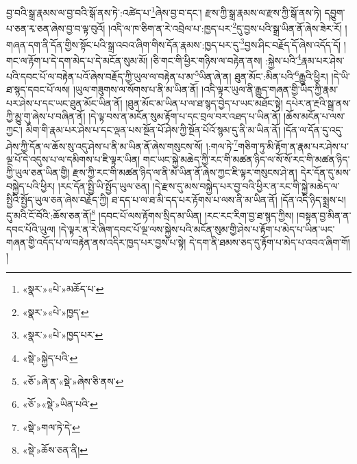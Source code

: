 བྱ་བའི་སྒྲ་རྣམས་ལ་བྱ་བའི་སྒོ་ནས་ཏེ་:འཚེད་པ་\footnote{«སྣར་»«པེ་»མཆོད་པ་}ཞེས་བྱ་བ་དང་། རྫས་ཀྱི་སྒྲ་རྣམས་ལ་རྫས་ཀྱི་སྒོ་ནས་ཏེ། དབྱུག་པ་ཅན་རྭ་ཅན་ཞེས་བྱ་བ་ལྟ་བུའོ། །འདི་ལ་ཁ་ཅིག་ན་རེ་འབྲེལ་པ་:ཁྱད་པར་\footnote{«སྣར་»«པེ་»ཁྱད་}དུ་བྱས་པའི་སྒྲ་ཡིན་ནོ་ཞེས་ཟེར་རོ། །གཞན་དག་ནི་དོན་གྱིས་སྟོང་པའི་སྒྲ་འབའ་ཞིག་གིས་དོན་རྣམས་:ཁྱད་པར་དུ་\footnote{«སྣར་»«པེ་»ཁྱད་པར་}བྱས་ཤིང་བརྗོད་དོ་ཞེས་འདོད་དོ། །གང་ལ་རྟོག་པ་དེ་དག་མེད་པ་དེ་མངོན་སུམ་མོ། །ཅི་གང་གི་ཕྱིར་གཉིས་ལ་བརྟེན་ནས། :སྐྱེས་པའི་\footnote{«སྡེ་»སྐྱེད་པའི་}རྣམ་པར་ཤེས་པའི་དབང་པོ་ལ་བརྟེན་པའོ་ཞེས་བརྗོད་ཀྱི་ཡུལ་ལ་བརྟེན་པ་མ་\footnote{«ཅོ་»ཞེ་ན་«སྡེ་»ཞེས་ཅི་ནས་}ཡིན་ཞེ་ན། ཐུན་མོང་:མིན་པའི་\footnote{«ཅོ་»«སྡེ་»ཡིན་པའི་}རྒྱུའི་ཕྱིར། །དེ་ཡི་ཐ་སྙད་དབང་པོ་ལས། །ཡུལ་གཟུགས་ལ་སོགས་པ་ནི་མ་ཡིན་ནོ། །འདི་ལྟར་ཡུལ་ནི་རྒྱུད་གཞན་གྱི་ཡིད་ཀྱི་རྣམ་པར་ཤེས་པ་དང་ཡང་ཐུན་མོང་ཡིན་ནོ། །ཐུན་མོང་མ་ཡིན་པ་ལ་ཐ་སྙད་བྱེད་པ་ཡང་མཐོང་སྟེ། དཔེར་ན་རྔའི་སྒྲ་ནས་ཀྱི་མྱུ་གུ་ཞེས་པ་བཞིན་ནོ། །དེ་ལྟ་བས་ན་མངོན་སུམ་རྟོག་པ་དང་བྲལ་བར་འཐད་པ་ཡིན་ནོ། །ཆོས་མངོན་པ་ལས་ཀྱང་། མིག་གི་རྣམ་པར་ཤེས་པ་དང་ལྡན་པས་སྔོན་པོ་ཤེས་ཀྱི་སྔོན་པོའོ་སྙམ་དུ་ནི་མ་ཡིན་ནོ། །དོན་ལ་དོན་དུ་འདུ་ཤེས་ཀྱི་དོན་ལ་ཆོས་སུ་འདུ་ཤེས་པ་ནི་མ་ཡིན་ནོ་ཞེས་གསུངས་སོ། །:གལ་ཏེ་\footnote{«སྡེ་»གལ་ཏེ་དེ་}གཅིག་ཏུ་མི་རྟོག་ན་རྣམ་པར་ཤེས་པ་ལྔ་པོ་དེ་འདུས་པ་ལ་དམིགས་པ་ཇི་ལྟར་ཡིན། གང་ཡང་སྐྱེ་མཆེད་ཀྱི་རང་གི་མཚན་ཉིད་ལ་སོ་སོ་རང་གི་མཚན་ཉིད་ཀྱི་ཡུལ་ཅན་ཡིན་གྱི། རྫས་ཀྱི་རང་གི་མཚན་ཉིད་ལ་ནི་མ་ཡིན་ནོ་ཞེས་ཀྱང་ཇི་ལྟར་གསུངས་ཤེ་ན། དེར་དོན་དུ་མས་བསྐྱེད་པའི་ཕྱིར། །རང་དོན་སྤྱི་ཡི་སྤྱོད་ཡུལ་ཅན། །དེ་རྫས་དུ་མས་བསྐྱེད་པར་བྱ་བའི་ཕྱིར་ན་རང་གི་སྐྱེ་མཆེད་ལ་སྤྱིའི་སྤྱོད་ཡུལ་ཅན་ཞེས་བརྗོད་ཀྱི། ཐ་དད་པ་ལ་ཐ་མི་དད་པར་རྟོགས་པ་ལས་ནི་མ་ཡིན་ནོ། །དོན་འདི་ཉིད་སྨྲས་པ། དུ་མའི་ངོ་བོའི་:ཆོས་ཅན་ནོ།\footnote{«སྡེ་»ཆོས་ཅན་ནི།} །དབང་པོ་ལས་རྟོགས་སྲིད་མ་ཡིན། །རང་རང་རིག་བྱ་ཐ་སྙད་ཀྱིས། །བསྟན་བྱ་མིན་ན་དབང་པོའི་ཡུལ། །དེ་ལྟར་ན་རེ་ཞིག་དབང་པོ་ལྔ་ལས་སྐྱེས་པའི་མངོན་སུམ་གྱི་ཤེས་པ་རྟོག་པ་མེད་པ་ཡིན་ཡང་གཞན་གྱི་འདོད་པ་ལ་བརྟེན་ནས་འདིར་ཁྱད་པར་བྱས་པ་སྟེ། དེ་དག་ནི་ཐམས་ཅད་དུ་རྟོག་པ་མེད་པ་འབའ་ཞིག་གོ། །
